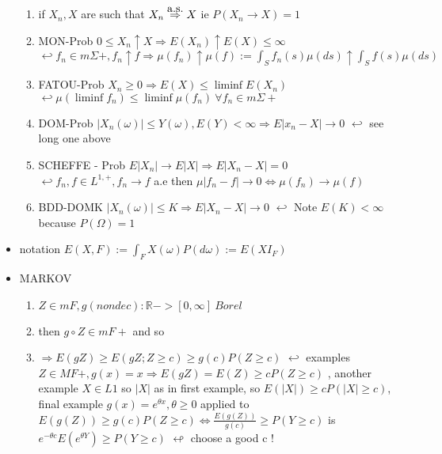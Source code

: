 \documentclass[10pt,landscape,a4paper]{article}
\newcommand\myright[1]{\stackrel{{\normalfont\mbox{#1}}}{ \Rightarrow }}
\begin{document}
\begin{multicols*}{3}
\begin{spacing}{0.5}
\begin{itemize}
\begin{enumerate}
\item if $X_n,X$ are such that $X_n \myright{a.s.} X$ ie $P(X_n \rightarrow X)=1$

\item \colorbox{green!10}{MON-Prob $ \boxed{ 0 \le X_n \uparrow X \Rightarrow E(X_n) \uparrow E(X) \le \infty }$ } $ \hookleftarrow {f_n} \in m\Sigma+, f_n \uparrow f \Rightarrow \mu(f_n) \uparrow \mu(f) := \int_S f_n(s) \mu(ds) \uparrow \int_S f(s) \mu(ds) $

\item \colorbox{green!10}{FATOU-Prob $ \boxed { X_n \ge 0 \Rightarrow E(X) \le \liminf E(X_n) }$ } $ \hookleftarrow \mu (\liminf f_n) \le \liminf \mu(f_n) \ \forall f_n \in m\Sigma+$

\item \colorbox{green!10}{DOM-Prob $ \boxed { |X_n(\omega)| \le Y(\omega), E(Y) < \infty \Rightarrow E|x_n-X|\rightarrow 0 }$ } $ \hookleftarrow $ see long one above

\item \colorbox{green!10}{SCHEFFE - Prob $  \boxed{ E |X_n| \rightarrow E|X| \Rightarrow E|X_n-X|=0 }$ } $ \hookleftarrow f_n,f \in L^{1,+}, f_n \rightarrow f$ a.e then $\mu |f_n-f| \rightarrow 0 \Leftrightarrow \mu(f_n) \rightarrow \mu(f) $

\item \colorbox{green!10}{BDD-DOMK $ \boxed{ |X_n(\omega)| \le K \Rightarrow E |X_n-X| \rightarrow 0 }$ } $ \hookleftarrow$ Note $E(K) < \infty$ because $P(\Omega)=1$

\end{enumerate}


\item notation $E(X,F) := \int_F X(\omega) P(d\omega) := E(XI_F)$
\item \colorbox{orange!10}{MARKOV} 

\begin{enumerate}
\item $  Z \in mF, g (nondec): \mathbb{R}->[0,\infty]\ Borel$
\item then $g \circ Z \in mF+$ and so 
\item $\Rightarrow \boxed { E(gZ) \ge E (gZ;Z \ge c) \ge g(c) P(Z \ge c) }$  $ \hookleftarrow$ examples $Z \in MF+, g(x) = x \Rightarrow E(gZ)=E(Z)  \ge c P(Z \ge c)$ , another example $X \in L1$ so $|X|$ as in first example, so $ E(|X|) \ge c P(|X| \ge c) $, final example $g(x)= e^{\theta x}, \theta \ge 0$ applied to $E(g(Z)) \ge g(c) P(Z \ge c) \Leftrightarrow \frac{E(g(Z))}{g(c)} \ge P(Y \ge c) $ is $ e^{-\theta c}E(e^{\theta Y}) \ge P(Y \ge c)$ $\looparrowleft$ choose a good c !
\end{enumerate}


\end{itemize}
\end{spacing}
\end{multicols*}
\end{document}
